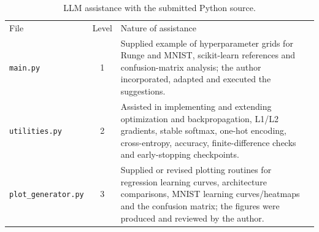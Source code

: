 \documentclass[aps,rmp,reprint,amsmath,amssymb,graphicx,longbibliography]{revtex4-1}
\begin{document}
\begin{table}[t]
\centering
\caption{LLM assistance with the submitted Python source.}
\label{tab:llm_programming}
\begin{ruledtabular}
\begin{tabular}{p{}cp{}}
File & Level & Nature of assistance \\
\texttt{main.py} & 1 & Supplied example of hyperparameter grids for
Runge and MNIST, scikit-learn references and confusion-matrix analysis;
the author incorporated, adapted and executed the suggestions. \\
\texttt{utilities.py} & 2 & Assisted in implementing and extending
optimization and backpropagation, L1/L2 gradients, stable softmax,
one-hot encoding, cross-entropy, accuracy, finite-difference checks
and early-stopping checkpoints. \\
\texttt{plot\_generator.py} & 3 & Supplied or revised plotting routines
for regression learning curves, architecture comparisons, MNIST
learning curves/heatmaps and the confusion matrix; the figures were
produced and reviewed by the author. \\
\end{tabular}
\end{ruledtabular}
\end{table}




\end{document}
